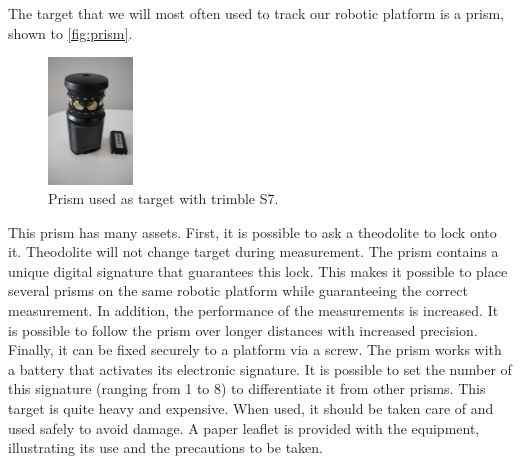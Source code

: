\documentclass[10pt,letterpaper,oneside]{article}
\begin{document}
The target that we will most often used to track our robotic platform is a prism, shown to \autoref{fig:prism}.

%

\begin{figure}[htb]
	\centering
	\includegraphics[width=0.2\textwidth]{./figs/prism.JPG}
	\caption{Prism used as target with trimble S7.}
	\label{fig:prism}
\end{figure}

This prism has many assets.
First, it is possible to ask a theodolite to lock onto it.
Theodolite will not change target during measurement.
The prism contains a unique digital signature that guarantees this lock.
This makes it possible to place several prisms on the same robotic platform while guaranteeing the correct measurement.
In addition, the performance of the measurements is increased.
It is possible to follow the prism over longer distances with increased precision.
Finally, it can be fixed securely to a platform via a screw.
The prism works with a battery that activates its electronic signature. 
It is possible to set the number of this signature (ranging from 1 to 8) to differentiate it from other prisms.
This target is quite heavy and expensive.
When used, it should be taken care of and used safely to avoid damage.
A paper leaflet is provided with the equipment, illustrating its use and the precautions to be taken.
\end{document}

